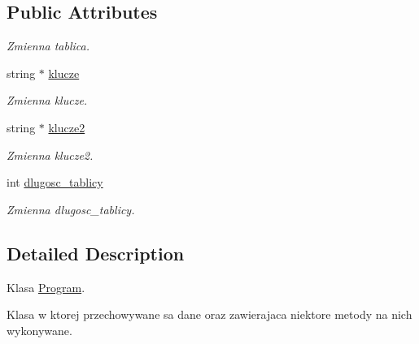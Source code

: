\subsection*{Public Attributes}
\begin{DoxyCompactItemize}
\item 
\begin{tabbing}
xx\=xx\=xx\=xx\=xx\=xx\=xx\=xx\=xx\=\kill
union \{\\
\hypertarget{union_tablica_1_1@0_a15feeb49d1b632313b0f85102261038d}{\>string $\ast$ {\bfseries napisy}\\
\hypertarget{union_tablica_1_1@0_a1eb24dfce133308650c2deae3d92fb8a}{\>int $\ast$ {\bfseries tablica}\\
\}; \\

\end{tabbing}\begin{DoxyCompactList}\small\item\em Zmienna tablica. \end{DoxyCompactList}\item 
string $\ast$ \hyperlink{class_tablica_a86dbdede5dfd94c3ff34e35213ba4ff2}{klucze}
\begin{DoxyCompactList}\small\item\em Zmienna klucze. \end{DoxyCompactList}\item 
string $\ast$ \hyperlink{class_tablica_a0041da06aff5d015c4338414bfb1d48f}{klucze2}
\begin{DoxyCompactList}\small\item\em Zmienna klucze2. \end{DoxyCompactList}\item 
int \hyperlink{class_tablica_ab0d3e4210dc8a77e0f1c75834084c077}{dlugosc\+\_\+tablicy}
\begin{DoxyCompactList}\small\item\em Zmienna dlugosc\+\_\+tablicy. \end{DoxyCompactList}\end{DoxyCompactItemize}


\subsection{Detailed Description}
Klasa \hyperlink{class_program}{Program}. 

Klasa w ktorej przechowywane sa dane oraz zawierajaca niektore metody na nich wykonywane. 

